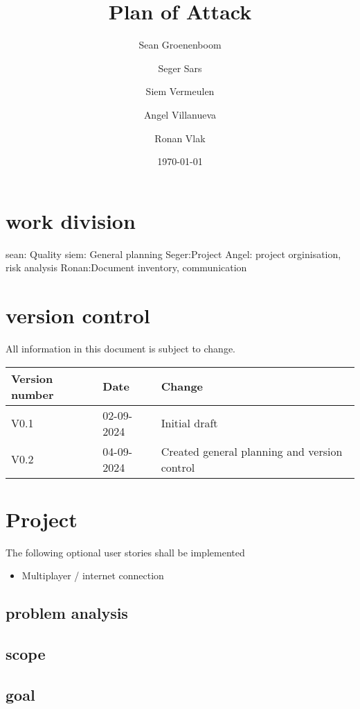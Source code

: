 \documentclass{article} %
\title{Plan of Attack} %
\author{Sean Groenenboom \and Seger Sars \and Siem Vermeulen \and Angel Villanueva \and Ronan Vlak} %
\date{\today} %
\begin{document}
    \maketitle %
    \newpage

    \tableofcontents %
    \newpage

    \section{work division}
    sean: Quality
    siem: General planning
    Seger:Project
    Angel: project orginisation, risk analysis
    Ronan:Document inventory, communication
    \newpage

    \section{version control}
    All information in this document is subject to change. \\
    \begin{tabularx}{\textwidth}{|X|X|X|}
        \hline
        \textbf{Version number} & \textbf{Date} & \textbf{Change} \\ \hline
        V0.1 & 02-09-2024 & Initial draft \\ \hline
        V0.2 & 04-09-2024 & Created general planning and version control \\ \hline
        \end{tabularx}
    \newpage
            
    \section{Project}
    The following optional user stories shall be implemented
    \begin{itemize}
        \item Multiplayer / internet connection
    \end{itemize}
    \subsection{problem analysis}
    \subsection{scope}
    \subsection{goal}
\end{document}
